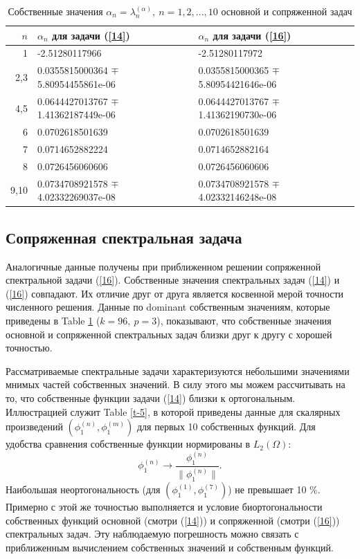 \documentclass[authoryear]{elsarticle}
\begin{document}
\begin{table}[h]
\caption{Собственные значения $\alpha_n = \lambda_n^{(\alpha )}, \ n = 1,2, ..., 10$
основной и сопряженной задач}
\label{t-4}
\begin{center}
\begin{tabular}{rll}
\hline
$n$ & $\alpha_n$ для задачи (\ref{14}) & $\alpha_n$ для задачи (\ref{16}) \\
\hline
1 & -2.51280117966 & -2.51280117972 \\
2,3 & 0.0355815000364 $\mp$ 5.80954455861e-06 & 0.0355815000365 $\mp$ 5.80954421646e-06 \\
4,5 & 0.0644427013767 $\mp$ 1.41362187449e-06 & 0.0644427013767 $\mp$ 1.41362190730e-06 \\
6 & 0.0702618501639 & 0.0702618501639 \\
7 & 0.0714652882224 & 0.0714652882164 \\
8 & 0.0726456060606 & 0.0726456060606 \\
9,10 & 0.0734708921578 $\mp$ 4.02332269037e-08 & 0.0734708921578 $\mp$ 4.02332146248e-08 \\
\hline
\end{tabular}
\end{center}
\end{table}

\subsection{Сопряженная спектральная задача} 

Аналогичные данные получены при приближенном решении сопряженной спектральной задачи (\ref{16}).
Собственные значения спектральных задач (\ref{14}) и (\ref{16}) совпадают.
Их отличие друг от друга является косвенной мерой точности численного решения.
Данные по dominant собственным значениям, которые приведены в Table \ref{t-4} ($k=96, \ p = 3$), показывают, что
собственные значения основной и сопряженной спектральных задач близки друг к другу
с хорошей точностью. 

Рассматриваемые спектральные задачи характеризуются
небольшими значениями мнимых частей собственных значений. 
В силу этого мы можем рассчитывать на то, что собственные функции задачи (\ref{14}) 
близки к ортогональным. Иллюстрацией служит Table \ref{t-5}, в которой 
приведены данные для скалярных произведений $(\phi_1^{(n)}, \phi_1^{(m)})$
для первых 10 собственных функций. Для удобства сравнения
собственные функции нормированы в $L_2(\Omega)$:
\[
 \phi_1^{(n)} \longrightarrow \frac{\phi_1^{(n)}}{\|\phi_1^{(n)}\|} .
\] 
Наибольшая неортогональность (для $(\phi_1^{(1)}, \phi_1^{(7)})$)
не превышает 10 \%.
Примерно с этой же точностью выполняется и условие биортогональности собственных
функций основной (смотри (\ref{14})) и сопряженной (смотри (\ref{16}))
спектральных задач.
Эту наблюдаемую погрешность можно связать с приближенным вычислением собственных значений и собственным функций.
\end{document}

